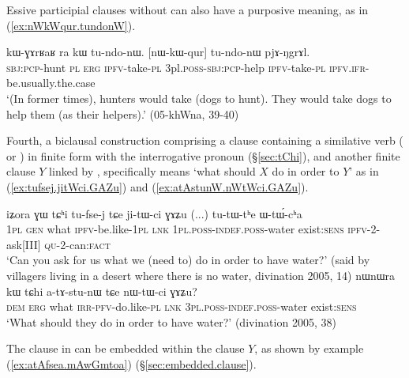 Essive participial clauses without  can also have a purposive meaning, as in (\ref{ex:nWkWqur.tundonW}).

\begin{exe}
\ex \label{ex:nWkWqur.tundonW}
\gll  kɯ-ɣɤrʁaʁ ra kɯ tu-ndo-nɯ. [nɯ-kɯ-qur] tu-ndo-nɯ pjɤ-ŋgrɤl. \\
\textsc{sbj}:\textsc{pcp}-hunt \textsc{pl} \textsc{erg} \textsc{ipfv}-take-\textsc{pl} 3pl.\textsc{poss}-\textsc{sbj}:\textsc{pcp}-help \textsc{ipfv}-take-\textsc{pl} \textsc{ipfv}.\textsc{ifr}-be.usually.the.case \\
\glt `(In former times), hunters would take (dogs to hunt). They would take dogs to help them (as their helpers).' (05-khWna, 39-40)
\end{exe}

Fourth, a biclausal construction comprising a clause containing a similative verb ( or ) in finite form with the interrogative pronoun (§\ref{sec:tChi}), and another finite clause $Y$ linked by , specifically means `what should $X$ do in order to $Y$' as in (\ref{ex:tufsej.jitWci.GAZu}) and (\ref{ex:atAstunW.nWtWci.GAZu}).

 \begin{exe}
 \ex  
 \begin{xlist}
\ex \label{ex:tufsej.jitWci.GAZu}
\gll  iʑora ɣɯ tɕʰi tu-fse-j tɕe ji-tɯ-ci ɣɤʑu (...) tu-tɯ-tʰe ɯ-tɯ́-cʰa \\
\textsc{1pl} \textsc{gen} what \textsc{ipfv}-be.like-\textsc{1pl} \textsc{lnk} \textsc{1pl}.\textsc{poss}-\textsc{indef}.\textsc{poss}-water exist:\textsc{sens} { } \textsc{ipfv}-2-ask[III] \textsc{qu}-2-can:\textsc{fact} \\
\glt `Can you ask for us what we (need to) do in order to have water?' (said by villagers living in a desert where there is no water, divination 2005, 14)
\ex \label{ex:atAstunW.nWtWci.GAZu}
\gll nɯnɯra kɯ tɕhi a-tɤ-stu-nɯ tɕe nɯ-tɯ-ci ɣɤʑu? \\
\textsc{dem} \textsc{erg} what \textsc{irr}-\textsc{pfv}-do.like-\textsc{pl} \textsc{lnk} \textsc{3pl}.\textsc{poss}-\textsc{indef}.\textsc{poss}-water exist:\textsc{sens} \\
\glt `What should they do in order to have water?' (divination 2005, 38)
 \end{xlist}
\end{exe} 

 The clause in  can be embedded within the clause $Y$, as shown by example (\ref{ex:atAfsea.mAwGmtoa}) (§\ref{sec:embedded.clause}).


